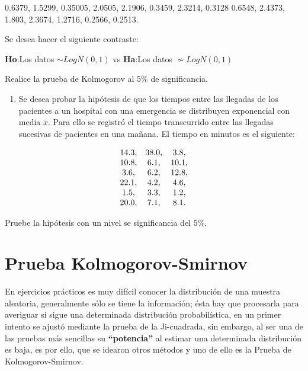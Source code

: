 \documentclass[a4paper,oneside,openany]{book}
\providecommand{\tightlist}{%
  \setlength{\itemsep}{0pt}\setlength{\parskip}{0pt}}
\begin{document}
0.6379, 1.5299, 0.35005, 2.0505, 2.1906, 0.3459, 2.3214, 0.3128 0.6548,
2.4373, 1.803, 2.3674, 1.2716, 0.2566, 0.2513.

Se desea hacer el siguiente contraste:

\textbf{Ho}:Los datos \(\sim LogN(0,1)\) vs \textbf{Ha}:Los datos
\(\nsim LogN(0,1)\)

Realice la prueba de Kolmogorov al \(5\%\) de significancia.

\begin{enumerate}
\def\labelenumi{\arabic{enumi}.}
\setcounter{enumi}{1}
\tightlist
\item
  Se desea probar la hipótesis de que los tiempos entre las llegadas de
  los pacientes a un hospital con una emergencia se distribuyen
  exponencial con media \(\bar{x}\). Para ello se registró el tiempo
  transcurrido entre las llegadas sucesivas de pacientes en una mañana.
  El tiempo en minutos es el siguiente:
\end{enumerate}

\[
\begin{equation*}
\begin{array}{c c c}
14.3, & 38.0, & 3.8,  \\ 
10.8, & 6.1,& 10.1, \\ 
3.6, & 6.2, & 12.8, \\ 
22.1, & 4.2, & 4.6,  \\ 
1.5, & 3.3, & 1.2,  \\   
20.0, & 7.1,& 8.1.\\
\end{array}
\end{equation*}
\]

Pruebe la hipótesis con un nivel se significancia del \(5\%\).

\chapter{Prueba Kolmogorov-Smirnov}\label{prueba-kolmogorov-smirnov}

En ejercicios prácticos es muy difícil conocer la distribución de una
muestra aleatoria, generalmente sólo se tiene la información; ésta hay
que procesarla para averiguar si sigue una determinada distribución
probabilística, en un primer intento se ajustó mediante la prueba de la
Ji-cuadrada, sin embargo, al ser una de las pruebas más sencillas su
\textbf{``potencia''} al estimar una determinada distribución es baja,
es por ello, que se idearon otros métodos y uno de ello es la Prueba de
Kolmogorov-Smirnov.
\end{document}
